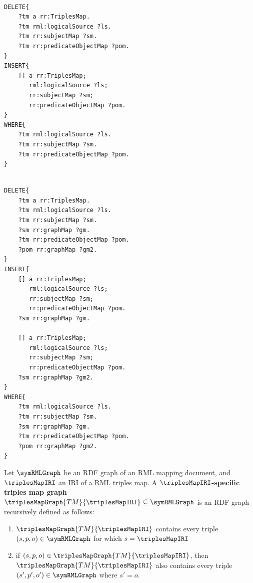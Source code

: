 \begin{lstlisting}[language=sparql, caption={SPARQL update query to replace
every triples map that has multiple predicate-object maps by a corresponding
set of triples maps that each have one of the predicate-object maps},
label={lst:sparql_tm_singlepom}, float=ht]

DELETE{
    ?tm a rr:TriplesMap.
    ?tm rml:logicalSource ?ls. 
    ?tm rr:subjectMap ?sm.
    ?tm rr:predicateObjectMap ?pom.
}
INSERT{
    [] a rr:TriplesMap;
       rml:logicalSource ?ls;
       rr:subjectMap ?sm; 
       rr:predicateObjectMap ?pom.
}
WHERE{
    ?tm rml:logicalSource ?ls. 
    ?tm rr:subjectMap ?sm.
    ?tm rr:predicateObjectMap ?pom.
}
\end{lstlisting}


\begin{lstlisting}[language=sparql, caption={SPARQL update query to ensure 
that each triples map contain only one graph map if it exists},
label={lst:sparql_graphmap_norm}, float=ht]

DELETE{
    ?tm a rr:TriplesMap.
    ?tm rml:logicalSource ?ls. 
    ?tm rr:subjectMap ?sm.
    ?sm rr:graphMap ?gm. 
    ?tm rr:predicateObjectMap ?pom.
    ?pom rr:graphMap ?gm2.
}
INSERT{
    [] a rr:TriplesMap;
       rml:logicalSource ?ls;
       rr:subjectMap ?sm; 
       rr:predicateObjectMap ?pom.
    ?sm rr:graphMap ?gm. 

    [] a rr:TriplesMap;
       rml:logicalSource ?ls;
       rr:subjectMap ?sm; 
       rr:predicateObjectMap ?pom.
    ?sm rr:graphMap ?gm2. 
}
WHERE{
    ?tm rml:logicalSource ?ls. 
    ?tm rr:subjectMap ?sm.
    ?sm rr:graphMap ?gm. 
    ?tm rr:predicateObjectMap ?pom.
    ?pom rr:graphMap ?gm2.
}
\end{lstlisting}

\begin{definition}
	Let $\symRMLGraph$ be an RDF graph of an RML mapping document, and
	$\triplesMapIRI$ an IRI of a RML triples map.
	A \textbf{$\triplesMapIRI$-specific triples map graph
		$\triplesMapGraph{TM}{\triplesMapIRI} \subseteq \symRMLGraph$} is an RDF graph
	recursively defined as follows:
	\begin{enumerate}
		\item  $\triplesMapGraph{TM}{\triplesMapIRI}$ contains every triple
		      $(s,p,o) \in \symRMLGraph$ for which $s = \triplesMapIRI$
		\item if $(s,p,o) \in \triplesMapGraph{TM}{\triplesMapIRI}$, then
		      $\triplesMapGraph{TM}{\triplesMapIRI}$ also contains every triple
		      $(s',p',o') \in \symRMLGraph$ where $s' = o$.
	\end{enumerate}
\end{definition}

